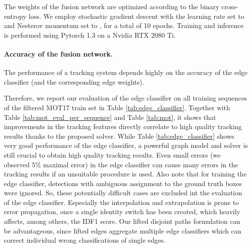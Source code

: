 \documentclass{article}
\begin{document}
The weights of the fusion network are optimized according to the binary cross-entropy loss.
We employ stochastic gradient descent with the learning rate set to  and Nesterov momentum set to , for a total of 10 epochs. Training and inference is performed using Pytorch 1.3 on a Nvidia  RTX 2080 Ti. 

\paragraph{Accuracy of the fusion network.}
The performance of a tracking system depends highly on the accuracy of the edge classifier (and the corresponding edge weights).

Therefore, we report our evaluation of the edge classifier on all training sequences of the filtered MOT17 train set in Table \ref{tab:edge_classifier}.
Together with Table \ref{tab:mot_eval_per_sequence} and Table \ref{tab:mot}, it shows that improvements in the tracking features directly correlate to high quality tracking results thanks to the proposed solver. While Table \ref{tab:edge_classifier} shows very good performance of the edge classifier, a powerful graph model and solver is still crucial to obtain high quality tracking results. Even small errors (we observed 5\% maximal error) in the edge classifier can cause many errors in the tracking results if an unsuitable procedure is used. 
Also note that for training the edge classifier, detections with ambiguous assignment to the ground truth boxes were ignored. So, these potentially difficult cases are excluded int the evaluation of the edge classifier.
Especially the interpolation and extrapolation is prone to error propagation, once a single identity switch has been created, which heavily affects, among others,  the IDF1 score. Our lifted disjoint paths formulation can be advantageous, since lifted edges aggregate multiple edge classifiers which can correct individual wrong classifications of single edges.
\end{document}
